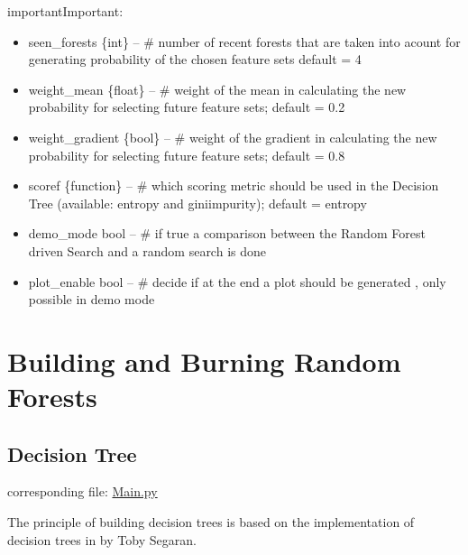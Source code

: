 \documentclass[letterpaper,10pt,english]{sphinxmanual}
\begin{document}
\begin{sphinxadmonition}{important}{Important:}
\begin{fulllineitems}
\begin{itemize}
\item {} 
seen\_forests \{int\} -- \# number of recent forests that are taken into acount for generating probability of the chosen feature sets default = 4

\item {} 
weight\_mean \{float\} -- \# weight of the mean in calculating the new probability for selecting future feature sets; default = 0.2

\item {} 
weight\_gradient \{bool\} -- \# weight of the gradient in calculating the new probability for selecting future feature sets; default = 0.8

\item {} 
scoref \{function\} -- \# which scoring metric should be used in the Decision Tree (available: entropy and giniimpurity); default = entropy

\item {} 
demo\_mode bool -- \# if true a comparison between the Random Forest driven Search and a random search is done

\item {} 
plot\_enable bool -- \# decide if at the end a plot should be generated , only possible in demo mode

\end{itemize}

\end{fulllineitems}

\end{sphinxadmonition}


\chapter{Building and Burning Random Forests}
\label{\detokenize{index:building-and-burning-random-forests}}\label{\detokenize{index:loop}}

\section{Decision Tree}
\label{\detokenize{DT::doc}}\label{\detokenize{DT:decision-tree}}\label{\detokenize{DT:singletree}}
corresponding file: \href{https://github.com/weinertmos/ForestFire/blob/master/source/ForestFire/Main.py}{Main.py}

The principle of building decision trees is based on the implementation of decision trees in \label{\detokenize{DT:id1}}{\hyperref[\detokenize{Overview:collective-intelligence}]{}} by Toby Segaran.
\end{document}
